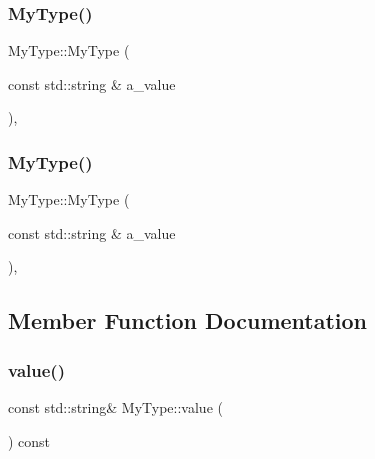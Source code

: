 \mbox{\label{class_my_type_a74d6f29a06e298321a6e5f0b91b020e7}} 
\subsubsection{\texorpdfstring{MyType()}{MyType()}\hspace{0.1cm}{\footnotesize\ttfamily [2/3]}}
{\footnotesize\ttfamily My\+Type\+::\+My\+Type (\begin{DoxyParamCaption}\item[{const std\+::string \&}]{a\+\_\+value }\end{DoxyParamCaption})\hspace{0.3cm}{\ttfamily [inline]}, {\ttfamily [explicit]}}

\mbox{\label{class_my_type_a74d6f29a06e298321a6e5f0b91b020e7}} 
\subsubsection{\texorpdfstring{MyType()}{MyType()}\hspace{0.1cm}{\footnotesize\ttfamily [3/3]}}
{\footnotesize\ttfamily My\+Type\+::\+My\+Type (\begin{DoxyParamCaption}\item[{const std\+::string \&}]{a\+\_\+value }\end{DoxyParamCaption})\hspace{0.3cm}{\ttfamily [inline]}, {\ttfamily [explicit]}}



\subsection{Member Function Documentation}
\mbox{\label{class_my_type_a04eaace57f0ecd8ee8898defbdee31b4}} 
\subsubsection{\texorpdfstring{value()}{value()}\hspace{0.1cm}{\footnotesize\ttfamily [1/3]}}
{\footnotesize\ttfamily const std\+::string\& My\+Type\+::value (\begin{DoxyParamCaption}{ }\end{DoxyParamCaption}) const\hspace{0.3cm}{\ttfamily [inline]}}

